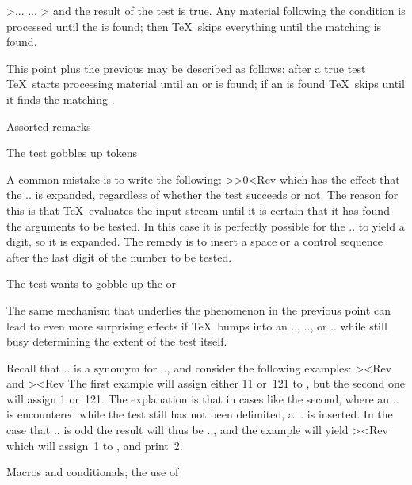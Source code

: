 \item \ver>\if... \else ... \fi> and the result of the test is true.
 Any material following the condition is processed until the 
 is found; then \TeX\ skips everything until the matching 
 is found.
 
 This point plus the previous may be described as follows:
 after a true test \TeX\ starts processing material until
 an  or  is found; if an  is found
 \TeX\ skips until it finds the matching .
\itemliststop


\point Assorted remarks

\spoint The test gobbles up tokens

A common mistake is to write the following:
\Ver>\ifnum\x>0\someaction \else\anotheraction \fi<Rev
which has the effect that the \ver.\someaction. is expanded,
regardless of whether the test succeeds or not. 
The reason for this is that \TeX\ evaluates the input stream until
it is certain that it has found the arguments to be tested.
In this case it is perfectly possible for the \ver.\someaction.
to yield a digit, so it is expanded. The remedy is to insert
\altt
a space or a  control sequence
after the last digit of the number to be tested.

\spoint The test wants to gobble up the  or 

The same mechanism that underlies the phenomenon in the previous
point can lead to even more surprising effects if \TeX\
bumps into an \ver.\else., \ver.\or., or \ver.\fi. 
while still busy determining the extent of the test itself.

Recall that \ver.\pageno. is a synomym for \ver.., and
consider the following examples:
\Ver>\newcount\nct {}\ifodd\pageno{}<Rev
and
\Ver>\newcount\nct {}\ifodd{}<Rev
The first example will assign either 11 or~121 to , 
but the second one will assign 1 or~121. 
The explanation is that
in cases like the second, where
\altt
an \ver.\else. is encountered while the
test still has not been delimited, a \ver.\relax. is inserted.
In the case that \ver.. is odd the result will thus be \ver.\relax.,
and the example will yield \Ver>\nct=1\relax2<Rev
which will assign~1 to , and print~2.


 Macros and conditionals; the use of 

